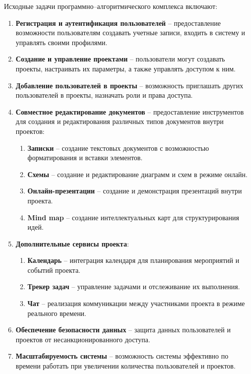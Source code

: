 Исходные задачи программно--алгоритмического комплекса включают:

\begin{enumerate}[wide=12.5mm, leftmargin=12.5mm]
    \item \textbf{Регистрация и аутентификация пользователей} -- предоставление возможности пользователям создавать учетные записи, входить в систему и управлять своими профилями.
    \item \textbf{Создание и управление проектами} -- пользователи могут создавать проекты, настраивать их параметры, а также управлять доступом к ним.
    \item \textbf{Добавление пользователей в проекты} -- возможность приглашать других пользователей в проекты, назначать роли и права доступа.
    \item \textbf{Совместное редактирование документов} -- предоставление инструментов для создания и редактирования различных типов документов внутри проектов:
    \begin{enumerate}[wide=12.5mm, leftmargin=12.5mm]
        \item \textbf{Записки} -- создание текстовых документов с возможностью форматирования и вставки элементов.
        \item \textbf{Схемы} -- создание и редактирование диаграмм и схем в режиме онлайн.
        \item \textbf{Онлайн-презентации} -- создание и демонстрация презентаций внутри проекта.
        \item \textbf{Mind map} -- создание интеллектуальных карт для структурирования идей.
    \end{enumerate}
    \item \textbf{Дополнительные сервисы проекта}:
    \begin{enumerate}[wide=12.5mm, leftmargin=12.5mm]
        \item \textbf{Календарь} -- интеграция календаря для планирования мероприятий и событий проекта.
        \item \textbf{Трекер задач} -- управление задачами и отслеживание их выполнения.
        \item \textbf{Чат} -- реализация коммуникации между участниками проекта в режиме реального времени.
    \end{enumerate}
    \item \textbf{Обеспечение безопасности данных} -- защита данных пользователей и проектов от несанкционированного доступа.
    \item \textbf{Масштабируемость системы} -- возможность системы эффективно по времени работать при увеличении количества пользователей и проектов.

\end{enumerate}
